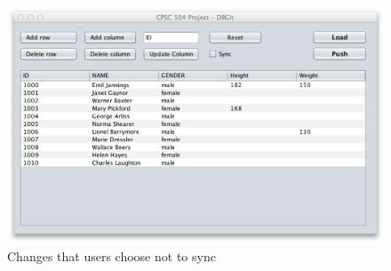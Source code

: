 \documentclass[12pt]{article}
\begin{document}
\begin{figure}
  \centering
  \includegraphics[width=0.9\columnwidth]{unsync}
  \caption{Changes that users choose not to sync}
  \label{fig:unsync}
\end{figure}
\end{document}
